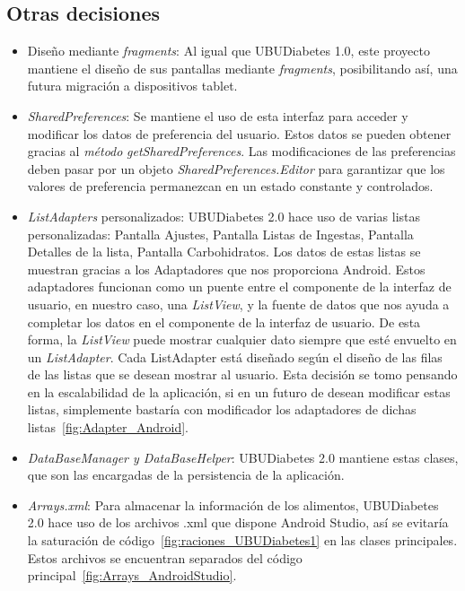 \subsection{Otras decisiones}
\begin{itemize}
	\item Diseño mediante \textit{fragments}: Al igual que UBUDiabetes 1.0, este proyecto mantiene el diseño de sus pantallas mediante \textit{fragments}, posibilitando así, una futura migración a dispositivos tablet.
	\item \textit{SharedPreferences}: Se mantiene el uso de esta interfaz para acceder y modificar los datos de preferencia del usuario. Estos datos se pueden obtener gracias al \textit{método} \textit{getSharedPreferences}. Las modificaciones de las preferencias deben pasar por un objeto \textit{SharedPreferences.Editor} para garantizar que los valores de preferencia permanezcan en un estado constante y controlados.
	\item \textit{ListAdapters} personalizados: UBUDiabetes 2.0 hace uso de varias listas personalizadas: Pantalla Ajustes, Pantalla Listas de Ingestas, Pantalla Detalles de la lista, Pantalla Carbohidratos. Los datos de estas listas se muestran gracias a los Adaptadores que nos proporciona Android. Estos adaptadores funcionan como un puente entre el componente de la interfaz de usuario, en nuestro caso, una \textit{ListView}, y la fuente de datos que nos ayuda a completar los datos en el componente de la interfaz de usuario. De esta forma, la \textit{ListView} puede mostrar cualquier dato siempre que esté envuelto en un \textit{ListAdapter}.
	Cada ListAdapter está diseñado según el diseño de las filas de las listas que se desean mostrar al usuario. Esta decisión se tomo pensando en la escalabilidad de la aplicación, si en un futuro de desean modificar estas listas, simplemente bastaría con modificador los adaptadores de dichas listas~\ref{fig:Adapter_Android}.
	\newpage
	\item \textit{DataBaseManager y DataBaseHelper}: UBUDiabetes 2.0 mantiene estas clases, que son las encargadas de la persistencia de la aplicación.
	\item \textit{Arrays.xml}: Para almacenar la información de los alimentos, UBUDiabetes 2.0 hace uso de los archivos .xml que dispone Android Studio, así se evitaría la saturación de código~\ref{fig:raciones_UBUDiabetes1} en las clases principales. Estos archivos se encuentran separados del código principal~\ref{fig:Arrays_AndroidStudio}.

\end{itemize}
